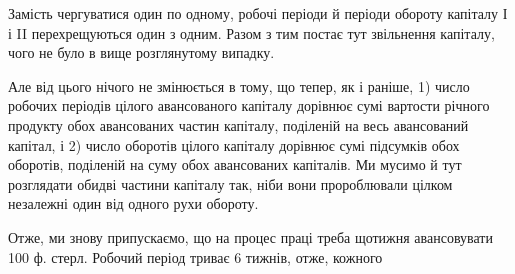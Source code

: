 Замість чергуватися один по одному, робочі періоди й періоди обороту
капіталу І і II перехрещуються один з одним. Разом з тим постає
тут звільнення капіталу, чого не було в вище розглянутому випадку.

Але від цього нічого не змінюється в тому, що тепер, як і раніше,
1) число робочих періодів цілого авансованого капіталу дорівнює сумі
вартости річного продукту обох авансованих частин капіталу, поділеній
на весь авансований капітал, і 2) число оборотів цілого капіталу дорівнює
сумі підсумків обох оборотів, поділеній на суму обох авансованих
капіталів. Ми мусимо й тут розглядати обидві частини капіталу так, ніби
вони пророблювали цілком незалежні один від одного рухи обороту.

Отже, ми знову припускаємо, що на процес праці треба щотижня
авансовувати 100 ф. стерл. Робочий період триває 6 тижнів, отже, кожного
\parbreak{}  %
